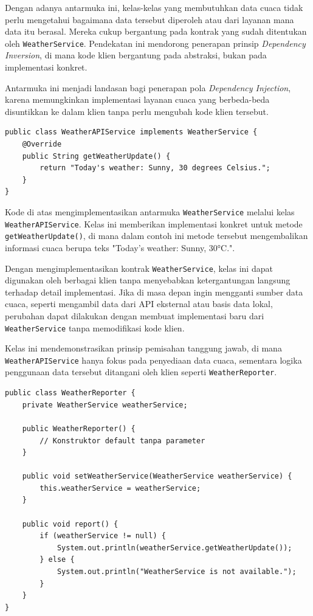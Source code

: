 Dengan adanya antarmuka ini, kelas-kelas yang membutuhkan data cuaca tidak perlu mengetahui bagaimana data tersebut diperoleh atau dari layanan mana data itu berasal. Mereka cukup bergantung pada kontrak yang sudah ditentukan oleh \texttt{WeatherService}. Pendekatan ini mendorong penerapan prinsip \textit{Dependency Inversion}, di mana kode klien bergantung pada abstraksi, bukan pada implementasi konkret.

Antarmuka ini menjadi landasan bagi penerapan pola \textit{Dependency Injection}, karena memungkinkan implementasi layanan cuaca yang berbeda-beda disuntikkan ke dalam klien tanpa perlu mengubah kode klien tersebut.


\begin{lstlisting}[style=JavaStyle, caption={Implementasi Konkret dari WeatherService}, label={lst:di-weather-api}]
public class WeatherAPIService implements WeatherService {
	@Override
	public String getWeatherUpdate() {
		return "Today's weather: Sunny, 30 degrees Celsius.";
	}
}
\end{lstlisting}


Kode di atas mengimplementasikan antarmuka \texttt{WeatherService} melalui kelas \texttt{WeatherAPIService}. Kelas ini memberikan implementasi konkret untuk metode \texttt{getWeatherUpdate()}, di mana dalam contoh ini metode tersebut mengembalikan informasi cuaca berupa teks "Today's weather: Sunny, 30°C.".

Dengan mengimplementasikan kontrak \texttt{WeatherService}, kelas ini dapat digunakan oleh berbagai klien tanpa menyebabkan ketergantungan langsung terhadap detail implementasi. Jika di masa depan ingin mengganti sumber data cuaca, seperti mengambil data dari API eksternal atau basis data lokal, perubahan dapat dilakukan dengan membuat implementasi baru dari \texttt{WeatherService} tanpa memodifikasi kode klien.

Kelas ini mendemonstrasikan prinsip pemisahan tanggung jawab, di mana \texttt{WeatherAPIService} hanya fokus pada penyediaan data cuaca, sementara logika penggunaan data tersebut ditangani oleh klien seperti \texttt{WeatherReporter}.


\begin{lstlisting}[style=JavaStyle, caption={Kelas Client yang Menggunakan Setter untuk Dependency Injection}, label={lst:di-weather-client-setter}]
public class WeatherReporter {
	private WeatherService weatherService;
	
	public WeatherReporter() {
		// Konstruktor default tanpa parameter
	}
	
	public void setWeatherService(WeatherService weatherService) {
		this.weatherService = weatherService;
	}
	
	public void report() {
		if (weatherService != null) {
			System.out.println(weatherService.getWeatherUpdate());
		} else {
			System.out.println("WeatherService is not available.");
		}
	}
}
\end{lstlisting}

